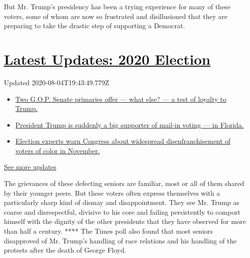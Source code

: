 But Mr. Trump's presidency has been a trying experience for many of
these voters, some of whom are now so frustrated and disillusioned that
they are preparing to take the drastic step of supporting a Democrat.

\hypertarget{latest-updates-2020-election}{%
\section{\texorpdfstring{\href{https://www.nytimes3xbfgragh.onion/2020/08/04/us/elections/primary-election-michigan-arizona-kansas.html?action=click\&pgtype=Article\&state=default\&region=MAIN_CONTENT_1\&context=storylines_live_updates}{Latest
Updates: 2020
Election}}{Latest Updates: 2020 Election}}\label{latest-updates-2020-election}}

Updated 2020-08-04T19:43:49.779Z

\begin{itemize}
\tightlist
\item
  \href{https://www.nytimes3xbfgragh.onion/2020/08/04/us/elections/primary-election-michigan-arizona-kansas.html?action=click\&pgtype=Article\&state=default\&region=MAIN_CONTENT_1\&context=storylines_live_updates\#link-3924dd44}{Two
  G.O.P. Senate primaries offer --- what else? --- a test of loyalty to
  Trump.}
\item
  \href{https://www.nytimes3xbfgragh.onion/2020/08/04/us/elections/primary-election-michigan-arizona-kansas.html?action=click\&pgtype=Article\&state=default\&region=MAIN_CONTENT_1\&context=storylines_live_updates\#link-32b39e33}{President
  Trump is suddenly a big supporter of mail-in voting --- in Florida.}
\item
  \href{https://www.nytimes3xbfgragh.onion/2020/08/04/us/elections/primary-election-michigan-arizona-kansas.html?action=click\&pgtype=Article\&state=default\&region=MAIN_CONTENT_1\&context=storylines_live_updates\#link-6d019753}{Election
  experts warn Congress about widespread disenfranchisement of voters of
  color in November.}
\end{itemize}

\href{https://www.nytimes3xbfgragh.onion/2020/08/04/us/elections/primary-election-michigan-arizona-kansas.html?action=click\&pgtype=Article\&state=default\&region=MAIN_CONTENT_1\&context=storylines_live_updates}{See
more updates}

The grievances of these defecting seniors are familiar, most or all of
them shared by their younger peers. But these voters often express
themselves with a particularly sharp kind of dismay and disappointment.
They see Mr. Trump as coarse and disrespectful, divisive to his core and
failing persistently to comport himself with the dignity of the other
presidents that they have observed for more than half a century. ****
The Times poll also found that most seniors disapproved of Mr. Trump's
handling of race relations and his handling of the protests after the
death of George Floyd.

